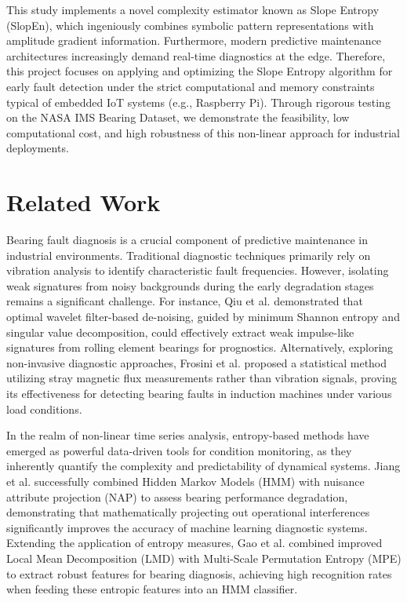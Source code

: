\documentclass{article}
\begin{document}
This study implements a novel complexity estimator known as Slope Entropy (SlopEn), which ingeniously combines symbolic pattern representations with amplitude gradient information. Furthermore, modern predictive maintenance architectures increasingly demand real-time diagnostics at the edge. Therefore, this project focuses on applying and optimizing the Slope Entropy algorithm for early fault detection under the strict computational and memory constraints typical of embedded IoT systems (e.g., Raspberry Pi). Through rigorous testing on the NASA IMS Bearing Dataset, we demonstrate the feasibility, low computational cost, and high robustness of this non-linear approach for industrial deployments.

\section{Related Work}
Bearing fault diagnosis is a crucial component of predictive maintenance in industrial environments. Traditional diagnostic techniques primarily rely on vibration analysis to identify characteristic fault frequencies. However, isolating weak signatures from noisy backgrounds during the early degradation stages remains a significant challenge. For instance, Qiu et al. \cite{qiu2006wavelet} demonstrated that optimal wavelet filter-based de-noising, guided by minimum Shannon entropy and singular value decomposition, could effectively extract weak impulse-like signatures from rolling element bearings for prognostics. Alternatively, exploring non-invasive diagnostic approaches, Frosini et al. \cite{frosini2015induction} proposed a statistical method utilizing stray magnetic flux measurements rather than vibration signals, proving its effectiveness for detecting bearing faults in induction machines under various load conditions.

In the realm of non-linear time series analysis, entropy-based methods have emerged as powerful data-driven tools for condition monitoring, as they inherently quantify the complexity and predictability of dynamical systems. Jiang et al. \cite{jiang2016hidden} successfully combined Hidden Markov Models (HMM) with nuisance attribute projection (NAP) to assess bearing performance degradation, demonstrating that mathematically projecting out operational interferences significantly improves the accuracy of machine learning diagnostic systems. Extending the application of entropy measures, Gao et al. \cite{gao2017multi} combined improved Local Mean Decomposition (LMD) with Multi-Scale Permutation Entropy (MPE) to extract robust features for bearing diagnosis, achieving high recognition rates when feeding these entropic features into an HMM classifier. 
\end{document}
